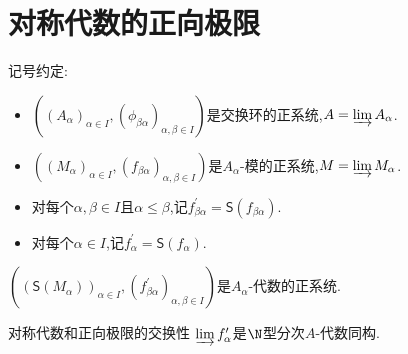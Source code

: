 \section{对称代数的正向极限}

记号约定:
\begin{itemize}
	\item $\left(\left(A_{\alpha}\right)_{\alpha\in I},\left(\phi_{\beta\alpha}\right)_{\alpha,\beta\in I}\right)$是交换环的正系统,$A=\varinjlim A_{\alpha}$.
	\item $\left(\left(M_{\alpha}\right)_{\alpha\in I},\left(f_{\beta\alpha}\right)_{\alpha,\beta\in I}\right)$是$A_{\alpha}$-模的正系统,$M=\varinjlim M_{\alpha}$.
	\item 对每个$\alpha,\beta\in I$且$\alpha\leq\beta$,记$f_{\beta\alpha}^{\prime}=\mathsf{S}\left(f_{\beta\alpha}\right)$.
	\item 对每个$\alpha\in I$,记$f_{\alpha}^{\prime}=\mathsf{S}\left(f_{\alpha}\right)$.
\end{itemize}

\begin{proposition}{}{}
	$\left(\left(\mathsf{S}\left(M_{\alpha}\right)\right)_{\alpha\in I},\left(f_{\beta\alpha}^{\prime}\right)_{\alpha,\beta\in I}\right)$是$A_{\alpha}$-代数的正系统.
\end{proposition}

\begin{proposition}{对称代数和正向极限的交换性}{}
	$\varinjlim f_{\alpha}^{\prime}$是$\N$型分次$A$-代数同构.
\end{proposition}
